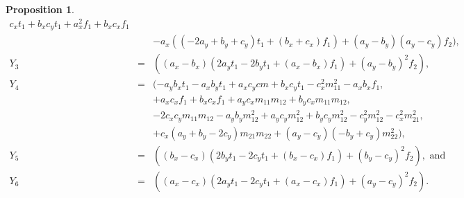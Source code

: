 \documentclass[8pt]{article}
\newtheorem{prop}{\bf Proposition}
\begin{document}
\begin{prop}
\begin{eqnarray*}
  c_{x} t_{1}+b_{x} c_{y} t_{1}+a_{x}^2 f_{1}+b_{x} c_{x} f_{1} \\
&&-a_{x} ((-2 a_{y}+b_{y}+c_{y}) t_{1}+(b_{x}+c_{x})
f_{1})+(a_{y}-b_{y})
(a_{y}-c_{y}) f_{2}), \\
Y_3 &=& ((a_{x}-b_{x}) (2 a_{y} t_{1}-2 b_{y} t_{1}+(a_{x}-b_{x})
 f_{1})
 +(a_{y}-b_{y})^2 f_{2}), \\
 Y_4 & = & (-a_{y} b_{x} t_{1}-a_{x} b_{y} t_{1}+a_{x} c_{y} c{m}
  +b_{x} c_{y} t_{1}-c_{x}^2 m_{11}^2-a_{x} b_{x} f_{1}, \\
&&  +a_{x} c_{x} f_{1}+b_{x} c_{x} f_{1}+a_{y} c_{x}
  m_{11} m_{12}+b_{y} c_{x} m_{11} m_{12}, \\
&&  -2 c_{x} c_{y} m_{11} m_{12}-a_{y} b_{y} m_{12}^2
  +a_{y} c_{y} m_{12}^2+b_{y} c_{y} m_{12}^2
  -c_{y}^2 m_{12}^2-c_{x}^2 m_{21}^2,  \\
&&  +c_{x} (a_{y}+b_{y}-2 c_{y}) m_{21} m_{22}
  +(a_{y}-c_{y}) (-b_{y}+c_{y}) m_{22}^2), \\
Y_5 &= & ((b_{x}-c_{x}) (2 b_{y} t_{1}-2 c_{y} t_{1}+(b_{x}-c_{x})
 f_{1}) +(b_{y}-c_{y})^2 f_{2}), \mbox{\ and} \\
 Y_6 &= & ((a_{x}-c_{x}) (2 a_{y} t_{1}-2
  c_{y} t_{1}+(a_{x}-c_{x}) f_{1})+(a_{y}-c_{y})^2 f_{2}).
\end{eqnarray*}
\end{prop}
\end{document}

